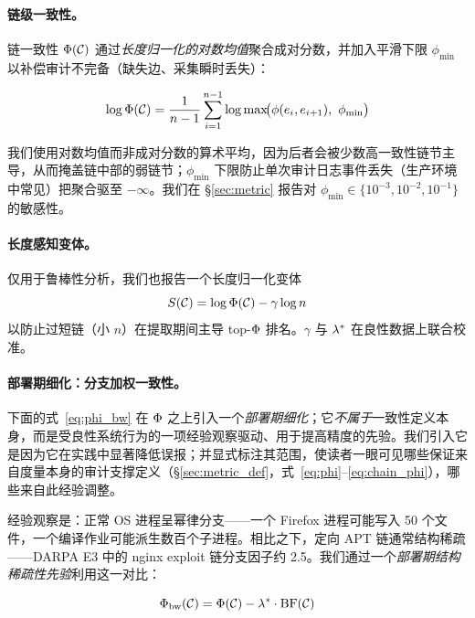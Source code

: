 \paragraph{链级一致性。}链一致性 $\Phi(\mathcal{C})$ 通过\emph{长度归一化的对数均值}聚合成对分数，并加入平滑下限 $\phi_{\min}$ 以补偿审计不完备（缺失边、采集瞬时丢失）：

\begin{equation}
\log \Phi(\mathcal{C}) = \frac{1}{n-1} \sum_{i=1}^{n-1} \log \max\!\bigl(\phi(e_i, e_{i+1}),\ \phi_{\min}\bigr)
\label{eq:chain_phi}
\end{equation}

我们使用对数均值而非成对分数的算术平均，因为后者会被少数高一致性链节主导，从而掩盖链中部的弱链节；$\phi_{\min}$ 下限防止单次审计日志事件丢失（生产环境中常见）把聚合驱至 $-\infty$。我们在 \S\ref{sec:metric} 报告对 $\phi_{\min} \in \{10^{-3}, 10^{-2}, 10^{-1}\}$ 的敏感性。

\paragraph{长度感知变体。}仅用于鲁棒性分析，我们也报告一个长度归一化变体
\begin{equation}
S(\mathcal{C}) = \log \Phi(\mathcal{C}) - \gamma \log n
\label{eq:phi_length}
\end{equation}
以防止过短链（小 $n$）在提取期间主导 top-$\Phi$ 排名。$\gamma$ 与 $\lambda^*$ 在良性数据上联合校准。

\paragraph{部署期细化：分支加权一致性。}下面的式~\ref{eq:phi_bw} 在 $\Phi$ 之上引入一个\emph{部署期细化}；它\emph{不属于}一致性定义本身，而是受良性系统行为的一项经验观察驱动、用于提高精度的先验。我们引入它是因为它在实践中显著降低误报；并显式标注其范围，使读者一眼可见哪些保证来自度量本身的审计支撑定义（\S\ref{sec:metric_def}，式~\ref{eq:phi}--\ref{eq:chain_phi}），哪些来自此经验调整。

经验观察是：正常 OS 进程呈幂律分支——一个 Firefox 进程可能写入 50 个文件，一个编译作业可能派生数百个子进程。相比之下，定向 APT 链通常结构稀疏——DARPA E3 中的 nginx exploit 链分支因子约 2.5。我们通过一个\emph{部署期结构稀疏性先验}利用这一对比：

\begin{equation}
\Phi_{\text{bw}}(\mathcal{C}) = \Phi(\mathcal{C}) - \lambda^* \cdot \operatorname{BF}(\mathcal{C})
\label{eq:phi_bw}
\end{equation}

